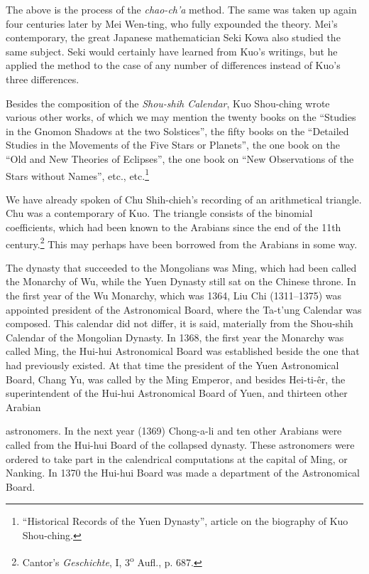 \documentclass[11pt]{article}
\newcommand{\scanpage}[2]{\clearpage\setcounter{footnote}{0}\noindent{\footnotesize\color{gray}PDF page #1 · #2}\par\medskip}
\newcommand{\scanfooter}{}
\begin{document}
The above is the process of the \emph{chao-ch'a} method. The same was taken up again four centuries later by Mei Wen-ting, who fully expounded the theory. Mei's contemporary, the great Japanese mathematician Seki Kowa also studied the same subject. Seki would certainly have learned from Kuo's writings, but he applied the method to the case of any number of differences instead of Kuo's three differences.

Besides the composition of the \emph{Shou-shih Calendar}, Kuo Shou-ching wrote various other works, of which we may mention the twenty books on the ``Studies in the Gnomon Shadows at the two Solstices'', the fifty books on the ``Detailed Studies in the Movements of the Five Stars or Planets'', the one book on the ``Old and New Theories of Eclipses'', the one book on ``New Observations of the Stars without Names'', etc., etc.\footnote{``Historical Records of the Yuen Dynasty'', article on the biography of Kuo Shou-ching.}

We have already spoken of Chu Shih-chieh's recording of an arithmetical triangle. Chu was a contemporary of Kuo. The triangle consists of the binomial coefficients, which had been known to the Arabians since the end of the 11th century.\footnote{Cantor's \emph{Geschichte}, I, 3\textsuperscript{o} Aufl., p. 687.} This may perhaps have been borrowed from the Arabians in some way.

The dynasty that succeeded to the Mongolians was Ming, which had been called the Monarchy of Wu, while the Yuen Dynasty still sat on the Chinese throne. In the first year of the Wu Monarchy, which was 1364, Liu Chi (1311--1375) was appointed president of the Astronomical Board, where the Ta-t'ung Calendar was composed. This calendar did not differ, it is said, materially from the Shou-shih Calendar of the Mongolian Dynasty. In 1368, the first year the Monarchy was called Ming, the Hui-hui Astronomical Board was established beside the one that had previously existed. At that time the president of the Yuen Astronomical Board, Chang Yu, was called by the Ming Emperor, and besides Hei-ti-êr, the superintendent of the Hui-hui Astronomical Board of Yuen, and thirteen other Arabian
\scanfooter

\scanpage{0121}{Chapter 15, printed page 107}
\setcounter{footnote}{0}
astronomers. In the next year (1369) Chong-a-li and ten other Arabians were called from the Hui-hui Board of the collapsed dynasty. These astronomers were ordered to take part in the calendrical computations at the capital of Ming, or Nanking. In 1370 the Hui-hui Board was made a department of the Astronomical Board.
\end{document}
